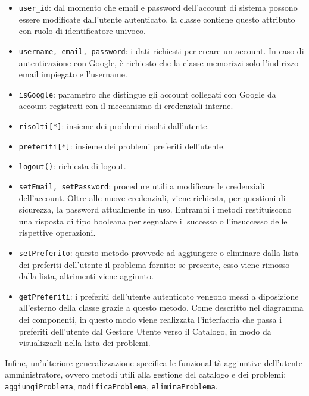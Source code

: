 \documentclass[11pt, a4paper]{article}
\theoremstyle{definition} %
\begin{document}
\begin{itemize}
    \item \texttt{user\_id}: dal momento che email e password dell'account di sistema
    possono essere modificate dall'utente autenticato, la classe contiene questo
    attributo con ruolo di identificatore univoco.

    \item \texttt{username, email, password}: i dati richiesti per creare un
    account. In caso di autenticazione con Google, è richiesto che la classe
    memorizzi solo l'indirizzo email impiegato e l'username.

    \item \texttt{isGoogle}: parametro che distingue gli account collegati con
    Google da account registrati con il meccanismo di credenziali interne.

    \item \texttt{risolti[*]}: insieme dei problemi risolti dall'utente.

    \item \texttt{preferiti[*]}: insieme dei problemi preferiti dell'utente.

    \item \texttt{logout()}: richiesta di logout.
    
    \item \texttt{setEmail, setPassword}: procedure utili a modificare le credenziali
    dell'account. Oltre alle nuove credenziali, viene richiesta, per questioni di sicurezza,
    la password attualmente in uso. Entrambi i metodi restituiscono una risposta
    di tipo booleana per segnalare il successo o l'insuccesso delle rispettive operazioni.

    \item \texttt{setPreferito}: questo metodo provvede ad aggiungere o
    eliminare dalla lista dei preferiti dell'utente il problema fornito: se
    presente, esso viene rimosso dalla lista, altrimenti viene aggiunto.

    \item \texttt{getPreferiti}: i preferiti dell'utente autenticato vengono
    messi a diposizione all'esterno della classe grazie a questo metodo.
    Come descritto nel diagramma dei componenti, in questo modo viene
    realizzata l'interfaccia che passa i preferiti dell'utente dal Gestore
    Utente verso il Catalogo, in modo da visualizzarli nella lista dei
    problemi.
\end{itemize}
Infine, un'ulteriore generalizzazione specifica le funzionalità aggiuntive
dell'utente amministratore, ovvero metodi utili alla gestione del catalogo
e dei problemi:
\texttt{aggiungiProblema}, \texttt{modificaProblema}, \texttt{eliminaProblema}.
\end{document}
